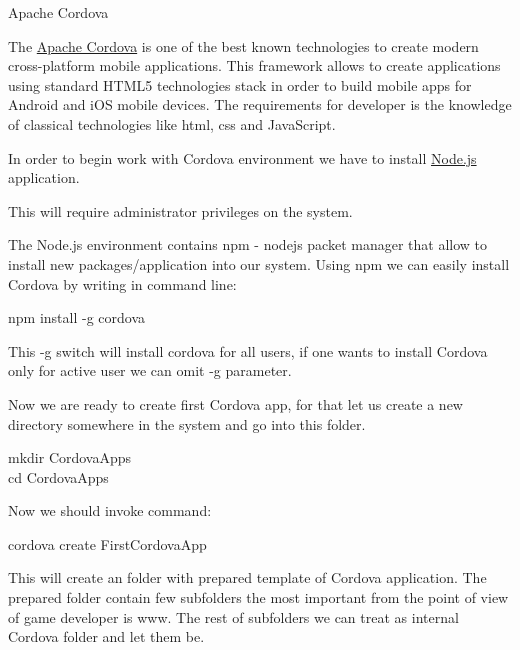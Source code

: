 \begin{header}
Apache Cordova
\end{header}

The \href{https://cordova.apache.org}{Apache Cordova} is one of the best known technologies to create modern cross-platform mobile applications. This framework allows to create applications using standard HTML5 technologies stack in order to build mobile apps for Android and iOS mobile devices. The requirements for developer is the knowledge of classical technologies like html, css and JavaScript.

In order to begin work with Cordova environment we have to install \href{http://nodejs.org}{Node.js} application. \begin{warning} This will require administrator privileges on the system.\end{warning} The Node.js environment contains npm - nodejs packet manager that allow to install new packages/application into our system. Using npm we can easily install Cordova by writing in command line:

\begin{code}
npm install -g cordova
\end{code}

This -g switch will install cordova for all users, if one wants to install Cordova only for active user we can omit -g parameter.

Now we are ready to create first Cordova app, for that let us create a new directory somewhere in the system and go into this folder.

\begin{code}
mkdir CordovaApps \\
cd CordovaApps
\end{code}

Now we should invoke command:
\begin{code}
cordova create FirstCordovaApp
\end{code}

This will create an folder with prepared template of Cordova application. The prepared folder contain few subfolders the most important from the point of view of game developer is www. The rest of subfolders we can treat as internal Cordova folder and let them be.


